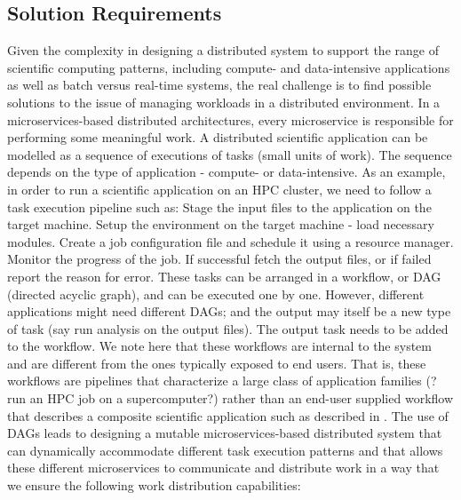 \documentclass[review]{elsarticle}
\begin{document}
\subsection{Solution Requirements}
Given the complexity in designing a distributed system to support the range of scientific computing patterns, including compute- and data-intensive applications as well as batch versus real-time systems, the real challenge is to find possible solutions to the issue of managing workloads in a distributed environment. In a microservices-based distributed architectures, every microservice is responsible for performing some meaningful work. A distributed scientific application can be modelled as a sequence of executions of tasks (small units of work). The sequence depends on the type of application - compute- or data-intensive. As an example, in order to run a scientific application on an HPC cluster, we need to follow a task execution pipeline such as:
Stage the input files to the application on the target machine.
Setup the environment on the target machine - load necessary modules.
Create a job configuration file and schedule it using a resource manager.
Monitor the progress of the job.
If successful fetch the output files, or if failed report the reason for error.
These tasks can be arranged in a workflow, or DAG (directed acyclic graph), and can be executed one by one. However, different applications might need different DAGs; and the output may itself be a new type of task (say run analysis on the output files).  The output task needs to be added to the workflow.  We note here that these workflows are internal to the system and are different from the ones typically exposed to end users. That is, these workflows are pipelines that characterize a large class of application families (?run an HPC job on a supercomputer?) rather than an end-user supplied workflow that describes a composite scientific application such as described in \cite{taylor2014workflows}.
The use of DAGs leads to designing a mutable microservices-based distributed system that can dynamically accommodate different task execution patterns and that allows these different microservices to communicate and distribute work in a way that we ensure the following work distribution capabilities:
\end{document}
